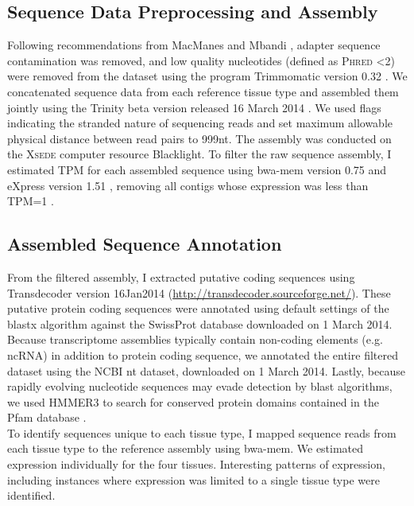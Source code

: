 \documentclass[11pt]{article}
\begin{document}
\subsection*{Sequence Data Preprocessing and Assembly}

Following recommendations from MacManes \cite{MacManes:2014io} and Mbandi \cite{Christoffels:2014bg}, adapter sequence contamination was removed, and low quality nucleotides (defined as \textsc{Phred} \textless 2) were removed from the dataset using the program Trimmomatic version 0.32  \cite{Lohse:2012fg}. We concatenated sequence data from each reference tissue type and assembled them jointly using the Trinity beta version released 16 March 2014 \cite{Haas:2013jq}. We used flags indicating the stranded nature of sequencing reads and set maximum allowable physical distance between read pairs to 999nt. The assembly was conducted on the \textsc{Xsede} computer resource Blacklight. To filter the raw sequence assembly, I estimated TPM for each assembled sequence using bwa-mem version 0.75 \cite{Li:2013wn} and eXpress version 1.51 \cite{Roberts:2012dh}, removing all contigs whose expression was less than TPM=1 \cite{Haas:2013jq}. \\

\subsection*{Assembled Sequence Annotation}

From the filtered assembly, I extracted putative coding sequences using Transdecoder version 16Jan2014 (\url{http://transdecoder.sourceforge.net/}). These putative protein coding sequences were annotated using default settings of the blastx algorithm \cite{Camacho:2009fc} against the SwissProt database downloaded on 1 March 2014. Because transcriptome assemblies typically contain non-coding elements (e.g. ncRNA) in addition to protein coding sequence, we annotated the entire filtered dataset using the NCBI nt dataset, downloaded on 1 March 2014. Lastly, because rapidly evolving nucleotide sequences may evade detection by blast algorithms, we used HMMER3 \cite{Wheeler:2013gj} to search for conserved protein domains contained in the Pfam database \cite{Punta:2012ko}. \\

To identify sequences unique to each tissue type, I mapped sequence reads from each tissue type to the reference assembly using bwa-mem. We estimated expression individually for the four tissues. Interesting patterns of expression, including instances where expression was limited to a single tissue type were identified. \\ 
\end{document}
